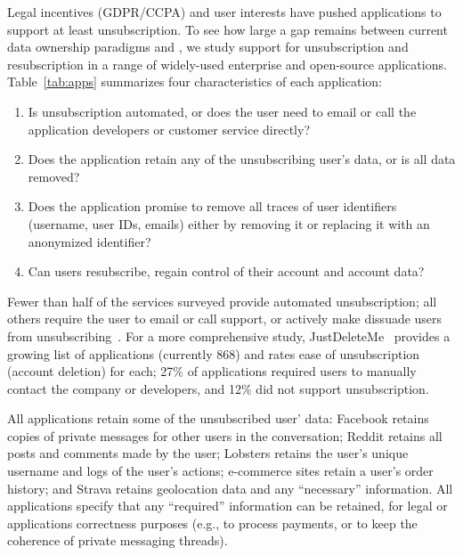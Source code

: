 %
Legal incentives (GDPR/CCPA) and user interests have pushed applications to support at least
unsubscription. To see how large a gap remains between current data ownership paradigms and \name, we
study support for unsubscription and resubscription in a range of widely-used enterprise and
open-source applications. 
%
Table~\ref{tab:apps} summarizes four characteristics of each application: 
\begin{enumerate}
    \item Is unsubscription automated, or does the user need to email or call the
application developers or customer service directly? 
    \item Does the application retain any of the unsubscribing user's data, or is all data removed?
    \item Does the application promise to remove all traces of user identifiers (\eg username, user
    IDs, emails) either by removing it or replacing it with an anonymized identifier?  
    \item Can users resubscribe, \ie regain control of their account and account data?
\end{enumerate}
Fewer than half of the services surveyed provide automated unsubscription; all others require the
user to email or call support, or actively make dissuade users from unsubscribing~\cite{nytimes:amazonsub}. For a more comprehensive study,
JustDeleteMe~\cite{jdm} provides a growing list of applications (currently 868) and rates ease
of unsubscription (account deletion) for each; 27\% of applications required users to manually
contact the company or developers, and 12\% did not support unsubscription. 

All applications retain some of the unsubscribed user' data: Facebook retains copies of private
messages for other users in the conversation; Reddit retains all posts and comments made by the
user; Lobsters retains the user's unique username and logs of the user's actions; e-commerce sites
retain a user's order history; and Strava retains geolocation data and any ``necessary''
information. All applications specify that any ``required'' information can be retained, for legal
or applications correctness purposes (e.g., to process payments, or to keep the coherence of private
messaging threads).  

